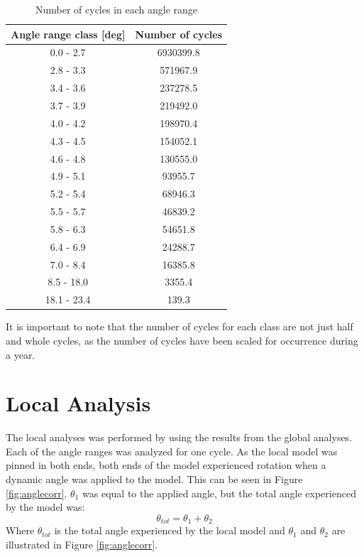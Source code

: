 \begin{table} [H]
\centering
\begin{tabular}{ |c|c|}
\hline
Angle range class [deg] & Number of cycles \\
 \hline
 \hline
0.0 - 2.7 & 6930399.8\\

2.8 - 3.3 & 571967.9\\
 
3.4 - 3.6 & 237278.5 \\
 
3.7 - 3.9& 219492.0  \\

4.0 - 4.2& 198970.4  \\

4.3  - 4.5 & 154052.1  \\

4.6 - 4.8 & 130555.0 \\

4.9 - 5.1 & 93955.7 \\

5.2 - 5.4 & 68946.3 \\

5.5 - 5.7 & 46839.2 \\

5.8 - 6.3 & 54651.8 \\

6.4 - 6.9 & 24288.7 \\

7.0 - 8.4 & 16385.8 \\

8.5 - 18.0 & 3355.4 \\

18.1 - 23.4 & 139.3  \\

 \hline
\end{tabular}
\caption{Number of cycles in each angle range}
\label{table:angleclass}
\end{table} 
\noindent It is important to note that the number of cycles for each class are not just half and whole cycles, as the number of cycles have been scaled for occurrence during a year.\newline 
\newline

\section{Local Analysis}
The local analyses was performed by using the results from the global analyses. Each of the angle ranges was analyzed for one cycle. As the local model was pinned in both ends, both ends of the model experienced rotation when a dynamic angle was applied to the model. This can be seen in Figure \ref{fig:anglecorr}. $\theta_1$ was equal to the applied angle, but the total angle experienced by the model was:
\begin{equation}
    \theta_{tot}=\theta_1 + \theta_2
\end{equation}
Where $\theta_{tot}$ is the total angle experienced by the local model and $\theta_1$ and $\theta_2$ are illustrated in Figure \ref{fig:anglecorr}.

